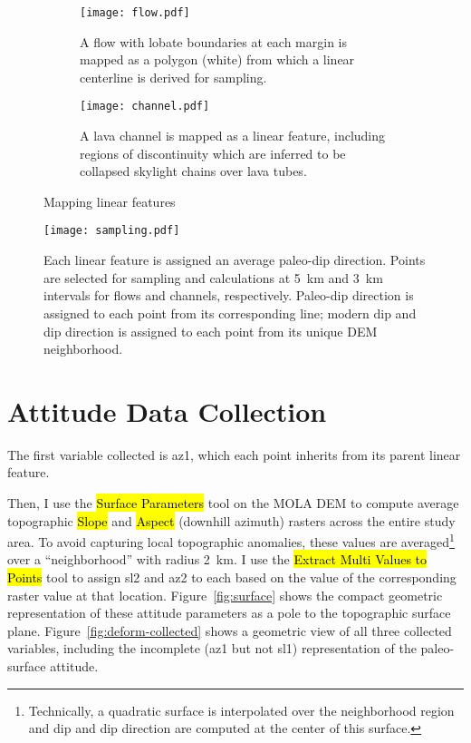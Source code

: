 \begin{figure}
    \centering
    \begin{subfigure}{\textwidth}
        \centering
        \texttt{[image: flow.pdf]}
        \caption[Mapped lava flow \& centerline]{A flow with lobate boundaries at each margin is mapped as a polygon (white) from which a linear centerline is derived for sampling.}%
        \label{fig:flow}
    \end{subfigure}
    \begin{subfigure}{\textwidth}
        \centering
        \texttt{[image: channel.pdf]}
        \caption[Mapped lava channel]{A lava channel is mapped as a linear feature, including regions of discontinuity which are inferred to be collapsed skylight chains over lava tubes.}%
        \label{fig:channel}
    \end{subfigure}
    \caption{Mapping linear features}%
    \label{fig:mapping-linear}
\end{figure}

\begin{figure}
    \centering
    \texttt{[image: sampling.pdf]}
    \caption[Sampling site selection]{Each linear feature is assigned an average paleo-dip direction. Points are selected for sampling and calculations at \qty{5}{\km} and \qty{3}{\km} intervals for flows and channels, respectively. Paleo-dip direction is assigned to each point from its corresponding line; modern dip and dip direction is assigned to each point from its unique \ac{DEM} neighborhood.}%
    \label{fig:sampling}
\end{figure}

\section{Attitude Data Collection}

\newcommand{\neighborhood}{\qty{2}{\km}}

The first variable collected is \acf{az1}, which each point inherits from its parent linear feature.

Then, I use the \hl{Surface Parameters} tool on the \ac{MOLA} \ac{DEM} to compute average topographic \hl{Slope} and \hl{Aspect} (downhill azimuth) rasters across the entire study area. To avoid capturing local topographic anomalies, these values are averaged\footnote{Technically, a quadratic surface is interpolated over the neighborhood region and dip and dip direction are computed at the center of this surface.} over a ``neighborhood'' with radius \neighborhood. I use the \hl{Extract Multi Values to Points} tool to assign \acf{sl2} and \acf{az2} to each based on the value of the corresponding raster value at that location. Figure~\ref{fig:surface} shows the compact geometric representation of these attitude parameters as a pole to the topographic surface plane. Figure~\ref{fig:deform-collected} shows a geometric view of all three collected variables, including the incomplete (\acs{az1} but not \acs{sl1}) representation of the paleo-surface attitude.

